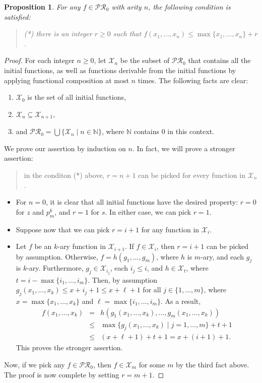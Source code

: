 \documentclass[12pt]{article}
\newtheorem{prop}{Proposition}
\begin{document}
\begin{prop} For any $f\in \mathcal{PR}_0$ with arity $n$, the following condition is satisfied:
\begin{quote} (*) there is an integer $r\ge 0$ such that $f(x_1,\ldots, x_n) \le \max\lbrace x_1,\ldots,x_n \rbrace +r$. \end{quote}
\end{prop}
\begin{proof}  For each integer $n\ge 0$, let $\mathcal{X}_n$ be the subset of $\mathcal{PR}_0$ that contains all the initial functions, as well as functions derivable from the initial functions by applying functional composition at most $n$ times.  The following facts are clear:
\begin{enumerate}
\item $\mathcal{X}_0$ is the set of all initial functions,
\item $\mathcal{X}_n\subseteq \mathcal{X}_{n+1}$, 
\item and $\mathcal{PR}_0=\bigcup \lbrace \mathcal{X}_n \mid n \in \mathbb{N}\rbrace$, where $\mathbb{N}$ contains $0$ in this context.
\end{enumerate}

We prove our assertion by induction on $n$.  In fact, we will prove a stronger assertion: 
\begin{quote}
in the conditon (*) above, $r=n+1$ can be picked for every function in $\mathcal{X}_n$.
\end{quote}
\begin{itemize}
\item For $n=0$, it is clear that all initial functions have the desired property: $r=0$ for $z$ and $p_m^k$, and $r=1$ for $s$.  In either case, we can pick $r=1$.
\item Suppose now that we can pick $r=i+1$ for any function in $\mathcal{X}_i$.  
\item Let $f$ be an $k$-ary function in $\mathcal{X}_{i+1}$.  If $f\in \mathcal{X}_i$, then $r=i+1$ can be picked by assumption.  Otherwise, $f=h(g_1,\ldots, g_m)$, where $h$ is $m$-ary, and each $g_j$ is $k$-ary.  Furthermore, $g_j \in \mathcal{X}_{i_j}$, each $i_j \le i$, and $h \in \mathcal{X}_t$, where $t=i-\max \lbrace i_1,\ldots, i_m\rbrace$.  Then, by assumption $g_j(x_1,\ldots,x_k) \le x + i_j + 1 \le x + \ell + 1$ for all $j\in \lbrace 1,\ldots, m\rbrace$, where $x=\max\lbrace x_1,\ldots,x_k\rbrace$ and $\ell = \max \lbrace i_1,\ldots, i_m\rbrace$.  As a result, 
\begin{eqnarray*}
f(x_1,\ldots,x_k) &=& h(g_1(x_1,\ldots,x_k),\ldots,g_m(x_1,\ldots,x_k)) \\
&\le& \max\lbrace g_j(x_1,\ldots,x_k)\mid j=1,\ldots, m \rbrace + t + 1 \\
&\le& (x + \ell + 1) + t + 1 = x + (i + 1) + 1.
\end{eqnarray*}
This proves the stronger assertion.
\end{itemize}
Now, if we pick any $f\in \mathcal{PR}_0$, then $f\in \mathcal{X}_m$ for some $m$ by the third fact above.  The proof is now complete by setting $r=m+1$.
\end{proof}
\end{document}
